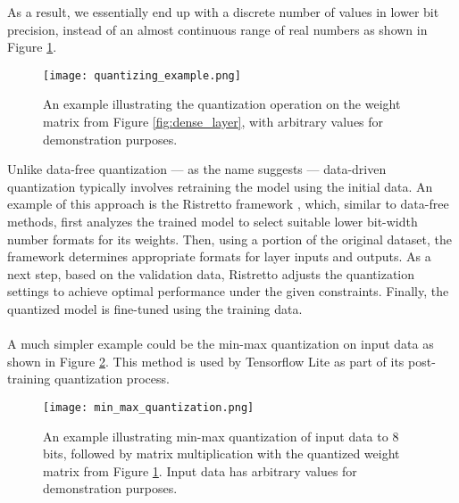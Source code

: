 \noindent  As a result, we essentially end up with a discrete number of values in lower bit precision, 
instead of an almost continuous range of real numbers as shown in Figure \ref{fig:quantizing_example}.
\\
\begin{figure}[h!]
  \centering
  \texttt{[image: quantizing\_example.png]}
  \caption{An example illustrating the quantization operation on the weight matrix from Figure \ref{fig:dense_layer}, 
  with arbitrary values for demonstration purposes.}
  \label{fig:quantizing_example}
\end{figure}

\noindent Unlike data-free quantization  —  as the name suggests — data-driven quantization typically involves retraining the model
using the initial data. An example of this approach is the Ristretto framework \cite{DBLP:journals/tnn/GyselPMG18}, which, similar to data-free methods, 
first analyzes the trained model to select suitable lower bit-width number formats for its weights.
Then, using a portion of the original dataset, the framework determines appropriate formats for layer inputs and outputs.
As a next step, based on the validation data, Ristretto adjusts the quantization settings to achieve optimal performance 
under the given constraints. Finally, the quantized model is fine-tuned using the training data.
\\
\\
A much simpler example could be the min-max quantization on input data as shown in Figure \ref{fig:min_max_quantization}. 
This method is used by Tensorflow Lite as part of its post-training quantization process.

\begin{figure}[h!]
  \centering
  \texttt{[image: min\_max\_quantization.png]}
  \caption{ An example illustrating min-max quantization of input data to 8 bits, followed by matrix multiplication with the quantized weight matrix from Figure \ref{fig:quantizing_example}.
  Input data has arbitrary values for demonstration purposes.}
  \label{fig:min_max_quantization}
\end{figure}

